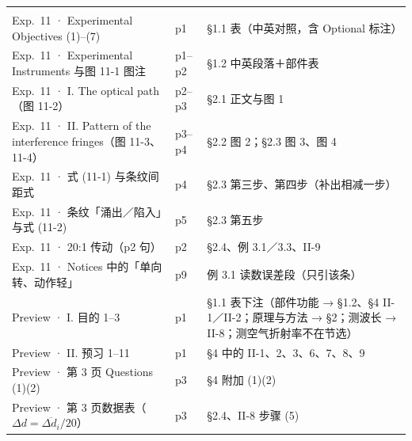 \documentclass[11pt]{ctexart}
\newcommand{\Dl}{d}
\begin{document}
\needspace{0.62\textheight}


{\small
\begin{longtable}{@{}L{4.9cm}C{1.5cm}L{9.3cm}@{}}
\toprule
{} &  &  \\
\midrule
\endfirsthead
\toprule
{} &  &  \\
\midrule
\endhead
\bottomrule
\endlastfoot
Exp.~11 · Experimental Objectives (1)--(7) & p1 & §1.1 表（中英对照，含 Optional 标注） \\
Exp.~11 · Experimental Instruments 与图 11-1 图注 & p1--p2 & §1.2 中英段落＋部件表 \\
Exp.~11 · I. The optical path（图 11-2） & p2--p3 & §2.1 正文与图 1 \\
Exp.~11 · II. Pattern of the interference fringes（图 11-3、11-4） & p3--p4 & §2.2 图 2；§2.3 图 3、图 4 \\
Exp.~11 · 式 (11-1) 与条纹间距式 & p4 & §2.3 第三步、第四步（补出相减一步） \\
Exp.~11 · 条纹「涌出／陷入」与式 (11-2) & p5 & §2.3 第五步 \\
Exp.~11 · 20:1 传动（p2 句） & p2 & §2.4、例 3.1／3.3、II-9 \\
Exp.~11 · Notices 中的「单向转、动作轻」 & p9 & 例 3.1 读数误差段（只引该条） \\
Preview · I. 目的 1--3 & p1 & §1.1 表下注（部件功能 → §1.2、§4 II-1／II-2；原理与方法 → §2；测波长 → II-8；测空气折射率不在节选） \\
Preview · II. 预习 1--11 & p1 & §4 中的 II-1、2、3、6、7、8、9 \\
Preview · 第 3 页 Questions (1)(2) & p3 & §4 附加 (1)(2) \\
Preview · 第 3 页数据表（$\Delta\Dl=\overline{\Delta\Dl_i}/20$） & p3 & §2.4、II-8 步骤 (5) \\
\end{longtable}}

\end{document}
